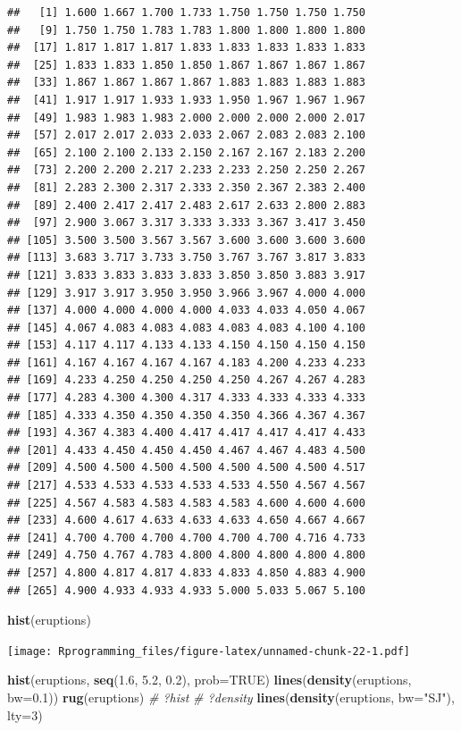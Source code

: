 \documentclass[10pt,]{krantz}
\makeatletter
\newenvironment{Shaded}{\begin{snugshade}}{\end{snugshade}}
\newcommand{\KeywordTok}[1]{\textcolor[rgb]{0.13,0.29,0.53}{\textbf{#1}}}
\newcommand{\DataTypeTok}[1]{\textcolor[rgb]{0.13,0.29,0.53}{#1}}
\newcommand{\DecValTok}[1]{\textcolor[rgb]{0.00,0.00,0.81}{#1}}
\newcommand{\FloatTok}[1]{\textcolor[rgb]{0.00,0.00,0.81}{#1}}
\newcommand{\StringTok}[1]{\textcolor[rgb]{0.31,0.60,0.02}{#1}}
\newcommand{\CommentTok}[1]{\textcolor[rgb]{0.56,0.35,0.01}{\textit{#1}}}
\newcommand{\OtherTok}[1]{\textcolor[rgb]{0.56,0.35,0.01}{#1}}
\newcommand{\NormalTok}[1]{#1}
\newenvironment{kframe}{%
\medskip{}
\setlength{\fboxsep}{.8em}
 \def\at@end@of@kframe{}%
 \ifinner\ifhmode%
  \def\at@end@of@kframe{\end{minipage}}%
  \begin{minipage}{\columnwidth}%
 \fi\fi%
 \def\FrameCommand##1{\hskip\@totalleftmargin \hskip-\fboxsep
 \colorbox{shadecolor}{##1}\hskip-\fboxsep
     \hskip-\linewidth \hskip-\@totalleftmargin \hskip\columnwidth}%
 \MakeFramed {\advance\hsize-\width
   \@totalleftmargin\z@ \linewidth\hsize
   \@setminipage}}%
 {\par\unskip\endMakeFramed%
 \at@end@of@kframe}
\renewenvironment{Shaded}{\begin{kframe}}{\end{kframe}}
\makeatother
\begin{document}
\begin{verbatim}
##   [1] 1.600 1.667 1.700 1.733 1.750 1.750 1.750 1.750
##   [9] 1.750 1.750 1.783 1.783 1.800 1.800 1.800 1.800
##  [17] 1.817 1.817 1.817 1.833 1.833 1.833 1.833 1.833
##  [25] 1.833 1.833 1.850 1.850 1.867 1.867 1.867 1.867
##  [33] 1.867 1.867 1.867 1.867 1.883 1.883 1.883 1.883
##  [41] 1.917 1.917 1.933 1.933 1.950 1.967 1.967 1.967
##  [49] 1.983 1.983 1.983 2.000 2.000 2.000 2.000 2.017
##  [57] 2.017 2.017 2.033 2.033 2.067 2.083 2.083 2.100
##  [65] 2.100 2.100 2.133 2.150 2.167 2.167 2.183 2.200
##  [73] 2.200 2.200 2.217 2.233 2.233 2.250 2.250 2.267
##  [81] 2.283 2.300 2.317 2.333 2.350 2.367 2.383 2.400
##  [89] 2.400 2.417 2.417 2.483 2.617 2.633 2.800 2.883
##  [97] 2.900 3.067 3.317 3.333 3.333 3.367 3.417 3.450
## [105] 3.500 3.500 3.567 3.567 3.600 3.600 3.600 3.600
## [113] 3.683 3.717 3.733 3.750 3.767 3.767 3.817 3.833
## [121] 3.833 3.833 3.833 3.833 3.850 3.850 3.883 3.917
## [129] 3.917 3.917 3.950 3.950 3.966 3.967 4.000 4.000
## [137] 4.000 4.000 4.000 4.000 4.033 4.033 4.050 4.067
## [145] 4.067 4.083 4.083 4.083 4.083 4.083 4.100 4.100
## [153] 4.117 4.117 4.133 4.133 4.150 4.150 4.150 4.150
## [161] 4.167 4.167 4.167 4.167 4.183 4.200 4.233 4.233
## [169] 4.233 4.250 4.250 4.250 4.250 4.267 4.267 4.283
## [177] 4.283 4.300 4.300 4.317 4.333 4.333 4.333 4.333
## [185] 4.333 4.350 4.350 4.350 4.350 4.366 4.367 4.367
## [193] 4.367 4.383 4.400 4.417 4.417 4.417 4.417 4.433
## [201] 4.433 4.450 4.450 4.450 4.467 4.467 4.483 4.500
## [209] 4.500 4.500 4.500 4.500 4.500 4.500 4.500 4.517
## [217] 4.533 4.533 4.533 4.533 4.533 4.550 4.567 4.567
## [225] 4.567 4.583 4.583 4.583 4.583 4.600 4.600 4.600
## [233] 4.600 4.617 4.633 4.633 4.633 4.650 4.667 4.667
## [241] 4.700 4.700 4.700 4.700 4.700 4.700 4.716 4.733
## [249] 4.750 4.767 4.783 4.800 4.800 4.800 4.800 4.800
## [257] 4.800 4.817 4.817 4.833 4.833 4.850 4.883 4.900
## [265] 4.900 4.933 4.933 4.933 5.000 5.033 5.067 5.100
\end{verbatim}

\begin{Shaded}
\begin{Highlighting}[]
\KeywordTok{hist}\NormalTok{(eruptions)}
\end{Highlighting}
\end{Shaded}

\texttt{[image: Rprogramming\_files/figure-latex/unnamed-chunk-22-1.pdf]}

\begin{Shaded}
\begin{Highlighting}[]
\KeywordTok{hist}\NormalTok{(eruptions, }\KeywordTok{seq}\NormalTok{(}\FloatTok{1.6}\NormalTok{, }\FloatTok{5.2}\NormalTok{, }\FloatTok{0.2}\NormalTok{), }\DataTypeTok{prob=}\OtherTok{TRUE}\NormalTok{)}
\KeywordTok{lines}\NormalTok{(}\KeywordTok{density}\NormalTok{(eruptions, }\DataTypeTok{bw=}\FloatTok{0.1}\NormalTok{))}
\KeywordTok{rug}\NormalTok{(eruptions)}
\CommentTok{# ?hist}
\CommentTok{# ?density}
\KeywordTok{lines}\NormalTok{(}\KeywordTok{density}\NormalTok{(eruptions, }\DataTypeTok{bw=}\StringTok{"SJ"}\NormalTok{), }\DataTypeTok{lty=}\DecValTok{3}\NormalTok{)}
\end{Highlighting}
\end{Shaded}
\end{document}
